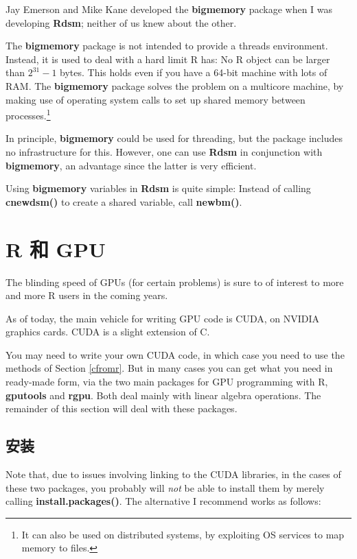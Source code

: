 Jay Emerson and Mike Kane developed the {\bf bigmemory} package when I
was developing {\bf Rdsm}; neither of us knew about the other.

The {\bf bigmemory} package is not intended to provide a threads
environment.  Instead, it is used to deal with a hard limit R has:
No R object can be larger than $2^{31}-1$ bytes.  This holds even if you
have a 64-bit machine with lots of RAM.  The {\bf bigmemory} package
solves the problem on a multicore machine, by making use of operating
system calls to set up shared memory between processes.\footnote{It can
also be used on distributed systems, by exploiting OS services to map
memory to files.}

In principle, {\bf bigmemory} could be used for threading, but the
package includes no infrastructure for this.  However, one can use {\bf
Rdsm} in conjunction with {\bf bigmemory}, an advantage since the latter
is very efficient.

Using {\bf bigmemory} variables in {\bf Rdsm} is quite simple:  Instead
of calling {\bf cnewdsm()} to create a shared variable, call {\bf newbm()}.

\section{R 和 GPU}

The blinding speed of GPUs (for certain problems) is sure to of interest
to more and more R users in the coming years.

As of today, the main vehicle for writing GPU code is CUDA, on NVIDIA
graphics cards.  CUDA is a slight extension of C.

You may need to write your own CUDA code, in which case you need to use
the methods of Section \ref{cfromr}.  But in many cases you can get what
you need in ready-made form, via the two main packages for GPU programming
with R, {\bf gputools} and {\bf rgpu}.  Both deal mainly with linear
algebra operations.  The remainder of this section will deal with these
packages.

\subsection{安装}
\label{gpuinstall}

Note that, due to issues involving linking to the CUDA libraries, in
the cases of these two packages, you probably will {\it not} be able to
install them by merely calling {\bf install.packages()}.   The
alternative I recommend works as follows:

